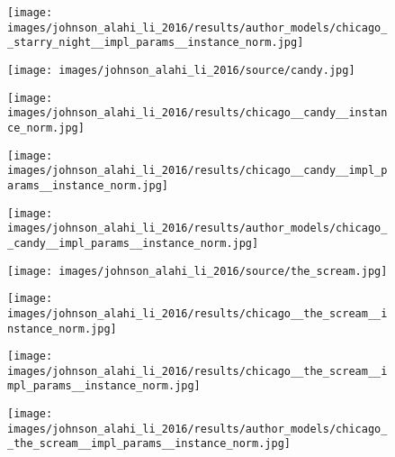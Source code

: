 \begin{figure}[H]
\begin{minipage}[t]{0.24\textwidth}
	\end{minipage}
	\hfill%
	\begin{minipage}[t]{0.24\textwidth}
		\centering
		\texttt{[image: images/johnson\_alahi\_li\_2016/results/author\_models/chicago\_\_starry\_night\_\_impl\_params\_\_instance\_norm.jpg]}
	\end{minipage}
    \hfill%
	\begin{minipage}[t]{0.24\textwidth}
		\centering
		\texttt{[image: images/johnson\_alahi\_li\_2016/source/candy.jpg]}
	\end{minipage}
	\hfill%
	\begin{minipage}[t]{0.24\textwidth}
		\centering
		\texttt{[image: images/johnson\_alahi\_li\_2016/results/chicago\_\_candy\_\_instance\_norm.jpg]}
	\end{minipage}
	\hfill%
	\begin{minipage}[t]{0.24\textwidth}
		\centering
		\texttt{[image: images/johnson\_alahi\_li\_2016/results/chicago\_\_candy\_\_impl\_params\_\_instance\_norm.jpg]}
	\end{minipage}
	\hfill%
	\begin{minipage}[t]{0.24\textwidth}
		\centering
		\texttt{[image: images/johnson\_alahi\_li\_2016/results/author\_models/chicago\_\_candy\_\_impl\_params\_\_instance\_norm.jpg]}
	\end{minipage}
	\hfill%
	\begin{minipage}[t]{0.24\textwidth}
		\centering
		\texttt{[image: images/johnson\_alahi\_li\_2016/source/the\_scream.jpg]}
	\end{minipage}
	\hfill%
	\begin{minipage}[t]{0.24\textwidth}
		\centering
		\texttt{[image: images/johnson\_alahi\_li\_2016/results/chicago\_\_the\_scream\_\_instance\_norm.jpg]}
	\end{minipage}
	\hfill%
	\begin{minipage}[t]{0.24\textwidth}
		\centering
		\texttt{[image: images/johnson\_alahi\_li\_2016/results/chicago\_\_the\_scream\_\_impl\_params\_\_instance\_norm.jpg]}
	\end{minipage}
	\hfill%
	\begin{minipage}[t]{0.24\textwidth}
		\centering
		\texttt{[image: images/johnson\_alahi\_li\_2016/results/author\_models/chicago\_\_the\_scream\_\_impl\_params\_\_instance\_norm.jpg]}
	\end{minipage}
    \hfill%
    \begin{minipage}[t]{0.24\textwidth}

\end{minipage}
\end{figure}
